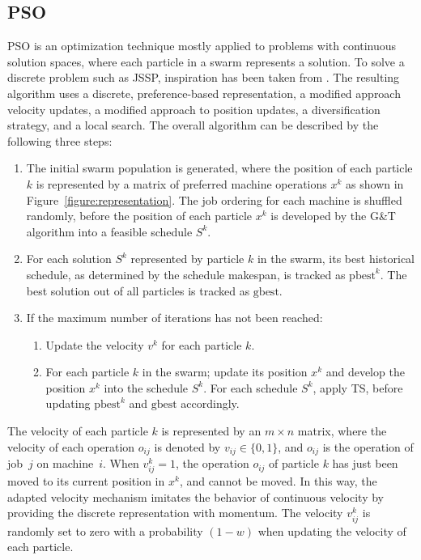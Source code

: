 \documentclass[paper=a4, fontsize=9pt]{scrartcl}
\begin{document}
\begin{multicols}{2}
\section*{\acl{PSO}}

\acf{PSO} is an optimization technique mostly applied to problems with continuous solution spaces, where each particle in a swarm represents a solution. To solve a discrete problem such as \ac{JSSP}, inspiration has been taken from \cite{sha2006hybrid}. The resulting algorithm uses a discrete, preference-based representation, a modified approach velocity updates, a modified approach to position updates, a diversification strategy, and a local search. The overall algorithm can be described by the following three steps:

\begin{enumerate}
    \item The initial swarm population is generated, where the position of each particle $k$ is represented by a matrix of preferred machine operations $x^k$ as shown in Figure~\ref{figure:representation}. The job ordering for each machine is shuffled randomly, before the position of each particle $x^k$ is developed by the G\&T algorithm into a feasible schedule $S^k$.
    \item For each solution $S^k$ represented by particle $k$ in the swarm, its best historical schedule, as determined by the schedule makespan, is tracked as $\text{pbest}^k$. The best solution out of all particles is tracked as $\text{gbest}$.
    \item If the maximum number of iterations has not been reached:
    \begin{enumerate}
        \item Update the velocity $v^k$ for each particle $k$.
        \item For each particle $k$ in the swarm; update its position $x^k$ and develop the position $x^k$ into the schedule $S^k$. For each schedule $S^k$, apply \ac{TS}, before updating $\text{pbest}^k$ and $\text{gbest}$ accordingly.
    \end{enumerate}
\end{enumerate}

The velocity of each particle $k$ is represented by an $m \times n$ matrix, where the velocity of each operation $o_{ij}$ is denoted by $v_{ij} \in \{0,1\}$, and $o_{ij}$ is the operation of job~$j$ on machine~$i$. When $v_{ij}^k = 1$, the operation $o_{ij}$ of particle $k$ has just been moved to its current position in $x^k$, and cannot be moved. In this way, the adapted velocity mechanism imitates the behavior of continuous velocity by providing the discrete representation with momentum. The velocity $v_{ij}^k$ is randomly set to zero with a probability $(1-w)$ when updating the velocity of each particle.


\end{multicols}
\end{document}
